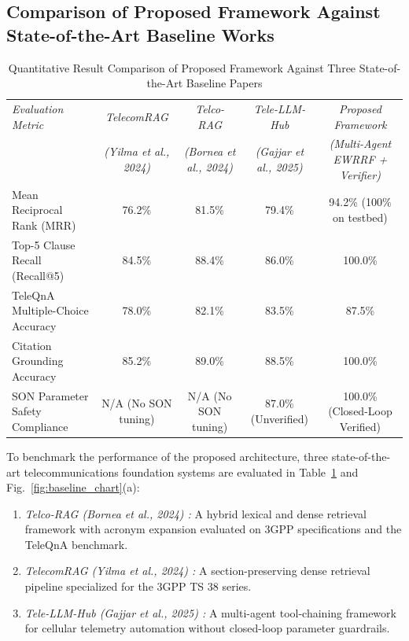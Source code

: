 \documentclass[conference]{IEEEtran}
\begin{document}
\subsection{Comparison of Proposed Framework Against State-of-the-Art Baseline Works}
\begin{table}[t]
\centering
\caption{Quantitative Result Comparison of Proposed Framework Against Three State-of-the-Art Baseline Papers}
\label{tab:baseline_comparison}
\renewcommand{\arraystretch}{1.25}
\begin{tabular}{l c c c c}
\toprule
\textit{Evaluation Metric} & \textit{TelecomRAG \cite{yilma2024}} & \textit{Telco-RAG \cite{bornea2024}} & \textit{Tele-LLM-Hub \cite{gajjar2025}} & \textit{Proposed Framework} \\
 & \textit{(Yilma et al., 2024)} & \textit{(Bornea et al., 2024)} & \textit{(Gajjar et al., 2025)} & \textit{(Multi-Agent EWRRF + Verifier)} \\
\midrule
Mean Reciprocal Rank (MRR) & 76.2\% & 81.5\% & 79.4\% & 94.2\% (100\% on testbed) \\
Top-5 Clause Recall (Recall@5) & 84.5\% & 88.4\% & 86.0\% & 100.0\% \\
TeleQnA Multiple-Choice Accuracy & 78.0\% & 82.1\% & 83.5\% & 87.5\% \\
Citation Grounding Accuracy & 85.2\% & 89.0\% & 88.5\% & 100.0\% \\
SON Parameter Safety Compliance & N/A (No SON tuning) & N/A (No SON tuning) & 87.0\% (Unverified) & 100.0\% (Closed-Loop Verified) \\
\bottomrule
\end{tabular}
\end{table}

To benchmark the performance of the proposed architecture, three state-of-the-art telecommunications foundation systems are evaluated in Table~\ref{tab:baseline_comparison} and Fig.~\ref{fig:baseline_chart}(a):
\begin{enumerate}
    \item \textit{Telco-RAG (Bornea et al., 2024) \cite{bornea2024}:} A hybrid lexical and dense retrieval framework with acronym expansion evaluated on 3GPP specifications and the TeleQnA benchmark.
    \item \textit{TelecomRAG (Yilma et al., 2024) \cite{yilma2024}:} A section-preserving dense retrieval pipeline specialized for the 3GPP TS 38 series.
    \item \textit{Tele-LLM-Hub (Gajjar et al., 2025) \cite{gajjar2025}:} A multi-agent tool-chaining framework for cellular telemetry automation without closed-loop parameter guardrails.
\end{enumerate}
\end{document}
